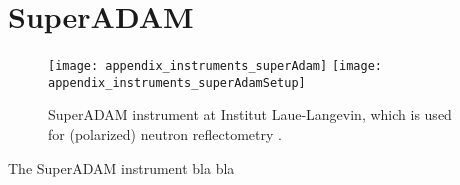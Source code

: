 \documentclass[\main/dresen_thesis.tex]{subfiles}
\begin{document}
\section{SuperADAM}\label{ch:appendix:lss:superadam}
\begin{figure}[h]
  \centering
  \texttt{[image: appendix\_instruments\_superAdam]}
  \texttt{[image: appendix\_instruments\_superAdamSetup]}
  \caption{\label{fig:appendix:lss:superadam}SuperADAM instrument at Institut Laue-Langevin, which is used for (polarized) neutron reflectometry \cite{Devishvili_2015_Super}.}
\end{figure}
The SuperADAM instrument bla bla
\end{document}
